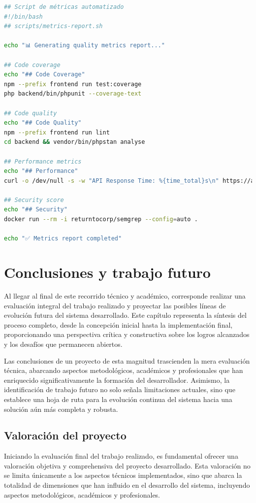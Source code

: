 \documentclass[12pt,a4paper,oneside]{report}
\begin{document}
\begin{lstlisting}[language=bash]
## Script de métricas automatizado
#!/bin/bash
## scripts/metrics-report.sh

echo "📊 Generating quality metrics report..."

## Code coverage
echo "## Code Coverage"
npm --prefix frontend run test:coverage
php backend/bin/phpunit --coverage-text

## Code quality
echo "## Code Quality"
npm --prefix frontend run lint
cd backend && vendor/bin/phpstan analyse

## Performance metrics
echo "## Performance"
curl -o /dev/null -s -w "API Response Time: %{time_total}s\n" https://api.tfg-platform.com/health

## Security score
echo "## Security"
docker run --rm -i returntocorp/semgrep --config=auto .

echo "✅ Metrics report completed"
\end{lstlisting}

\chapter{Conclusiones y trabajo
futuro}\label{conclusiones-y-trabajo-futuro}
Al llegar al final de este recorrido técnico y académico, corresponde
realizar una evaluación integral del trabajo realizado y proyectar las
posibles líneas de evolución futura del sistema desarrollado. Este
capítulo representa la síntesis del proceso completo, desde la
concepción inicial hasta la implementación final, proporcionando una
perspectiva crítica y constructiva sobre los logros alcanzados y los
desafíos que permanecen abiertos.

Las conclusiones de un proyecto de esta magnitud trascienden la mera
evaluación técnica, abarcando aspectos metodológicos, académicos y
profesionales que han enriquecido significativamente la formación del
desarrollador. Asimismo, la identificación de trabajo futuro no solo
señala limitaciones actuales, sino que establece una hoja de ruta para
la evolución continua del sistema hacia una solución aún más completa y
robusta.

\section{Valoración del proyecto}\label{valoraciuxf3n-del-proyecto}

Iniciando la evaluación final del trabajo realizado, es fundamental
ofrecer una valoración objetiva y comprehensiva del proyecto
desarrollado. Esta valoración no se limita únicamente a los aspectos
técnicos implementados, sino que abarca la totalidad de dimensiones que
han influido en el desarrollo del sistema, incluyendo aspectos
metodológicos, académicos y profesionales.
\end{document}
